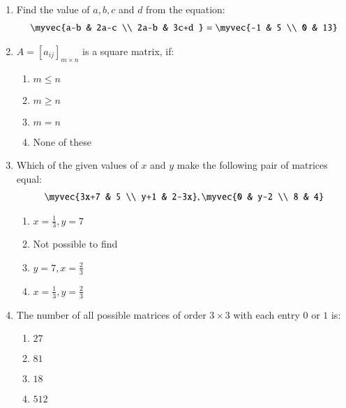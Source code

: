 \documentclass{article}
\theoremstyle{remark}
\begin{document}
\begin{enumerate}
\item Find the value of $a, b, c$ and $d$ from the equation:
\begin{align} \myvec 
{a-b & 2a-c \\ 2a-b &  3c+d } = 
\myvec{-1 & 5 \\ 0 & 13} \end{align}
\item $A=[a_{ij}]_{m\times n}$ is a square matrix, if:
\begin{enumerate}
\item $m \le n$
\item $m \ge n$
\item $m=n$
\item None of these
\end{enumerate}
\item Which of the given values of $x$ and $y$ make the following pair of matrices equal:
\begin{align} \myvec
{3x+7 & 5 \\ y+1 & 2-3x}, 
\myvec{0 & y-2 \\ 8 & 4}\end{align}
\begin{enumerate}
\item $x=, y=7$
\item Not possible to find 
\item $y=7, x=$
\item $x=, y=$
\end{enumerate}
\item The number of all possible matrices of order $3$ with each entry $0$ or $1$ is:
\begin{enumerate}
\item $27$
\item $81$
\item $18$
\item $512$
\end{enumerate}
\end{enumerate}
\end{document}
